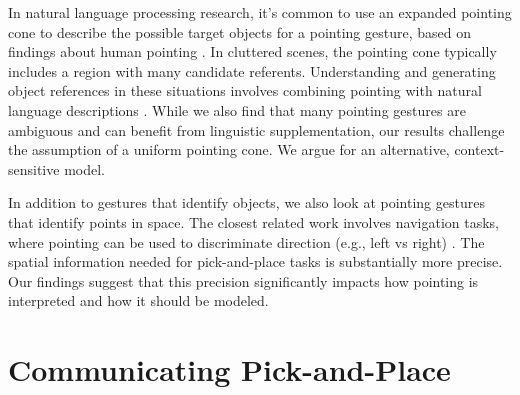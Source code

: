 \documentclass[letterpaper]{article} %
\begin{document}


In natural language processing research, it's common to use an expanded pointing cone to describe the possible target objects for a pointing gesture, based on findings about human pointing \cite{kranstedt2003deixis,rieser2004pointing}. In cluttered scenes, the pointing cone typically includes a region with many candidate referents.  Understanding and generating object references in these situations involves combining pointing with natural language descriptions \cite{han2018placing,kollar2014grounding}.  While we also find that many pointing gestures are ambiguous and can benefit from linguistic supplementation, our results challenge the assumption of a uniform pointing cone. We argue for an alternative, context-sensitive model.

In addition to gestures that identify objects, we also look at pointing gestures that identify points in space. The closest related work involves navigation tasks, where pointing can be used to discriminate direction (e.g., left vs right) \cite{mei2016listen,tellex2011understanding}. The spatial information needed for pick-and-place tasks is substantially more precise. Our findings suggest that this precision significantly impacts how pointing is interpreted and how it should be modeled.




\section{Communicating Pick-and-Place}
\label{problem}
\end{document}
